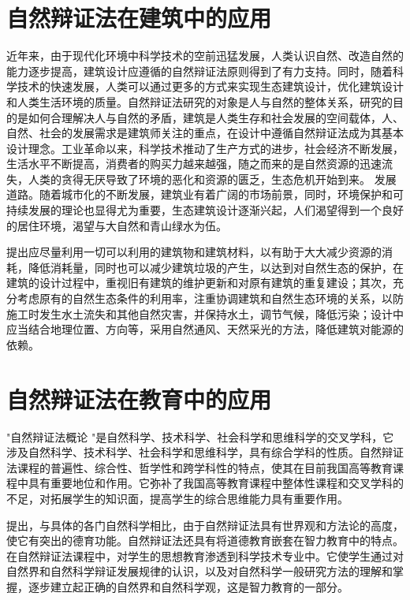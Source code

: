 \documentclass[UTF8,a4paper]{ctexart}
\begin{document}
\section{自然辩证法在建筑中的应用}
近年来，由于现代化环境中科学技术的空前迅猛发展，人类认识自然、改造自然的能力逐步提高，建筑设计应遵循的自然辩证法原则得到了有力支持。同时，随着科学技术的快速发展，人类可以通过更多的方式来实现生态建筑设计，优化建筑设计和人类生活环境的质量。自然辩证法研究的对象是人与自然的整体关系，研究的目的是如何合理解决人与自然的矛盾，建筑是人类生存和社会发展的空间载体，人、自然、社会的发展需求是建筑师关注的重点，在设计中遵循自然辩证法成为其基本设计理念。工业革命以来，科学技术推动了生产方式的进步，社会经济不断发展，生活水平不断提高，消费者的购买力越来越强，随之而来的是自然资源的迅速流失，人类的贪得无厌导致了环境的恶化和资源的匮乏，生态危机开始到来。 发展道路。随着城市化的不断发展，建筑业有着广阔的市场前景，同时，环境保护和可持续发展的理论也显得尤为重要，生态建筑设计逐渐兴起，人们渴望得到一个良好的居住环境，渴望与大自然和青山绿水为伍。
\par
\cite{RN11}提出应尽量利用一切可以利用的建筑物和建筑材料，以有助于大大减少资源的消耗，降低消耗量，同时也可以减少建筑垃圾的产生，以达到对自然生态的保护，在建筑的设计过程中，重视旧有建筑的维护更新和对原有建筑的重复建设；其次，充分考虑原有的自然生态条件的利用率，注重协调建筑和自然生态环境的关系，以防施工时发生水土流失和其他自然灾害，并保持水土，调节气候，降低污染；设计中应当结合地理位置、方向等，采用自然通风、天然采光的方法，降低建筑对能源的依赖。

\section{自然辩证法在教育中的应用}
"自然辩证法概论 "是自然科学、技术科学、社会科学和思维科学的交叉学科，它涉及自然科学、技术科学、社会科学和思维科学，具有综合学科的性质。自然辩证法课程的普遍性、综合性、哲学性和跨学科性的特点，使其在目前我国高等教育课程中具有重要地位和作用。它弥补了我国高等教育课程中整体性课程和交叉学科的不足，对拓展学生的知识面，提高学生的综合思维能力具有重要作用。
\par
\cite{RN13}提出，与具体的各门自然科学相比，由于自然辩证法具有世界观和方法论的高度，使它有突出的德育功能。自然辩证法还具有将道德教育嵌套在智力教育中的特点。在自然辩证法课程中，对学生的思想教育渗透到科学技术专业中。它使学生通过对自然界和自然科学辩证发展规律的认识，以及对自然科学一般研究方法的理解和掌握，逐步建立起正确的自然界和自然科学观，这是智力教育的一部分。
\end{document}
